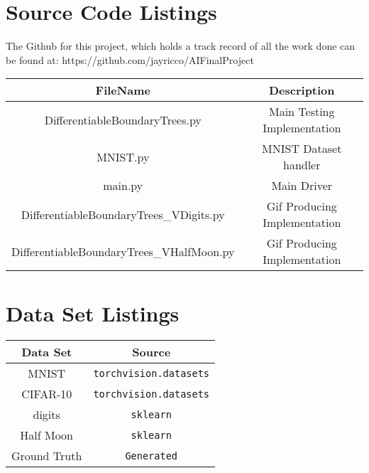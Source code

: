 \documentclass[10pt,letterpaper,twocolumn]{article}
\begin{document}
\appendix
	\section{Source Code Listings}
	The Github for this project, which holds a track record of all the work done can be found at:
	https://github.com/jayricco/AIFinalProject
	\centering
	\begin{tabular}{|c|c|}
		\hline 
		\rule[-1ex]{0pt}{2.5ex} \textbf{FileName} & \textbf{Description} \\ 
		\hline 
		\rule[-1ex]{0pt}{2.5ex} DifferentiableBoundaryTrees.py&  Main Testing Implementation\\ 
		\hline 
		\rule[-1ex]{0pt}{2.5ex} MNIST.py &  MNIST Dataset handler\\ 
		\hline 
		\rule[-1ex]{0pt}{2.5ex} main.py &  Main Driver\\ 
		\hline 
		\rule[-1ex]{0pt}{2.5ex} DifferentiableBoundaryTrees\_VDigits.py &  Gif Producing Implementation\\ 
		\hline 
		\rule[-1ex]{0pt}{2.5ex} DifferentiableBoundaryTrees\_VHalfMoon.py&  Gif Producing Implementation\\ 
	\end{tabular}
	\section{Data Set Listings}
	\centering
	\begin{tabular}{|c|c|}
		\hline 
		\rule[-1ex]{0pt}{2.5ex} \textbf{Data Set} & \textbf{Source} \\ 
		\hline 
		\rule[-1ex]{0pt}{2.5ex} MNIST &  \texttt{torchvision.datasets}\\ 
		\hline 
		\rule[-1ex]{0pt}{2.5ex} CIFAR-10 &  \texttt{torchvision.datasets}\\ 
		\hline 
		\rule[-1ex]{0pt}{2.5ex} digits &  \texttt{sklearn}\\ 
		\hline 
		\rule[-1ex]{0pt}{2.5ex} Half Moon &  \texttt{sklearn}\\ 
		\hline 
		\rule[-1ex]{0pt}{2.5ex} Ground Truth &  \texttt{Generated}\\ 
		\hline 
	\end{tabular} 
\end{document}
